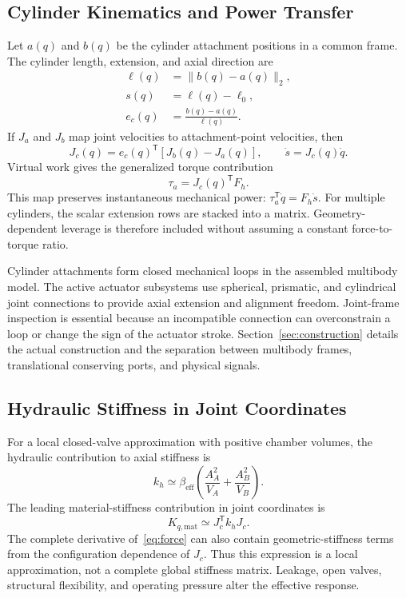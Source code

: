 \documentclass[conference,letterpaper]{IEEEtran}
\newcommand{\trans}{\mathsf{T}}
\begin{document}
\subsection{Cylinder Kinematics and Power Transfer}
Let $a(q)$ and $b(q)$ be the cylinder attachment positions in a common frame. The cylinder length, extension, and axial direction are
\begin{align}
\ell(q)&=\lVert b(q)-a(q)\rVert_2,\\
s(q)&=\ell(q)-\ell_0,\\
e_c(q)&=\frac{b(q)-a(q)}{\ell(q)}.
\end{align}
If $J_a$ and $J_b$ map joint velocities to attachment-point velocities, then
\begin{equation}
J_c(q)=e_c(q)^\trans[J_b(q)-J_a(q)],\qquad
\dot s=J_c(q)\dot q.
\end{equation}
Virtual work gives the generalized torque contribution
\begin{equation}
\tau_a=J_c(q)^\trans F_h.
\label{eq:force}
\end{equation}
This map preserves instantaneous mechanical power: $\tau_a^\trans\dot q=F_h\dot s$. For multiple cylinders, the scalar extension rows are stacked into a matrix. Geometry-dependent leverage is therefore included without assuming a constant force-to-torque ratio.

Cylinder attachments form closed mechanical loops in the assembled multibody model. The active actuator subsystems use spherical, prismatic, and cylindrical joint connections to provide axial extension and alignment freedom. Joint-frame inspection is essential because an incompatible connection can overconstrain a loop or change the sign of the actuator stroke. Section~\ref{sec:construction} details the actual construction and the separation between multibody frames, translational conserving ports, and physical signals.

\subsection{Hydraulic Stiffness in Joint Coordinates}
For a local closed-valve approximation with positive chamber volumes, the hydraulic contribution to axial stiffness is
\begin{equation}
k_h\simeq\beta_{\mathrm{eff}}
\left(\frac{A_A^2}{V_A}+\frac{A_B^2}{V_B}\right).
\end{equation}
The leading material-stiffness contribution in joint coordinates is
\begin{equation}
K_{q,\mathrm{mat}}\simeq J_c^\trans k_hJ_c.
\end{equation}
The complete derivative of~\eqref{eq:force} can also contain geometric-stiffness terms from the configuration dependence of $J_c$. Thus this expression is a local approximation, not a complete global stiffness matrix. Leakage, open valves, structural flexibility, and operating pressure alter the effective response.
\end{document}
